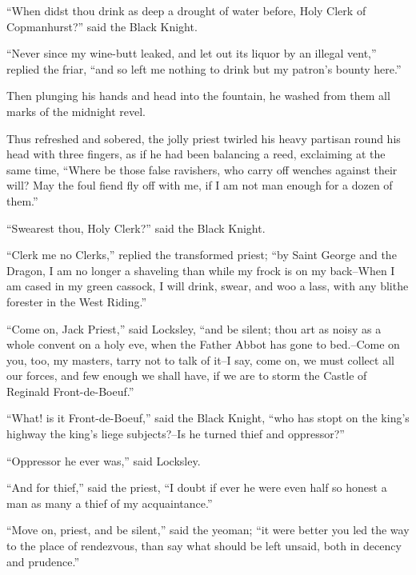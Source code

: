 ``When didst thou drink as deep a drought of water before, Holy Clerk of
Copmanhurst?'' said the Black Knight.

``Never since my wine-butt leaked, and let out its liquor by an illegal
vent,'' replied the friar, ``and so left me nothing to drink but my
patron's bounty here.''

Then plunging his hands and head into the fountain, he washed from them
all marks of the midnight revel.

Thus refreshed and sobered, the jolly priest twirled his heavy partisan
round his head with three fingers, as if he had been balancing a reed,
exclaiming at the same time, ``Where be those false ravishers, who carry
off wenches against their will? May the foul fiend fly off with me, if I
am not man enough for a dozen of them.''

``Swearest thou, Holy Clerk?'' said the Black Knight.

``Clerk me no Clerks,'' replied the transformed priest; ``by Saint
George and the Dragon, I am no longer a shaveling than while my frock is
on my back--When I am cased in my green cassock, I will drink, swear,
and woo a lass, with any blithe forester in the West Riding.''

``Come on, Jack Priest,'' said Locksley, ``and be silent; thou art as
noisy as a whole convent on a holy eve, when the Father Abbot has gone
to bed.--Come on you, too, my masters, tarry not to talk of it--I say,
come on, we must collect all our forces, and few enough we shall have,
if we are to storm the Castle of Reginald Front-de-Boeuf.''

``What! is it Front-de-Boeuf,'' said the Black Knight, ``who has stopt
on the king's highway the king's liege subjects?--Is he turned thief and
oppressor?''

``Oppressor he ever was,'' said Locksley.

``And for thief,'' said the priest, ``I doubt if ever he were even half
so honest a man as many a thief of my acquaintance.''

``Move on, priest, and be silent,'' said the yeoman; ``it were better
you led the way to the place of rendezvous, than say what should be left
unsaid, both in decency and prudence.''
